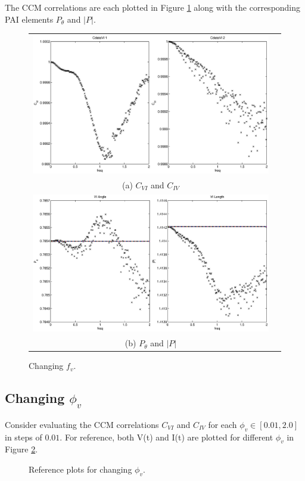 \documentclass{article}
\begin{document}
The CCM correlations are each plotted in Figure \ref{fig:fv} along with the corresponding PAI elements $P_\theta$ and $|P|$.
\begin{figure}[H]
\begin{tabular}{cc}
\includegraphics[scale=0.5]{RLcirc_varyV_freq2.eps} \\
(a) $C_{VI}$ and $C_{IV}$ \\[6pt]
\includegraphics[scale=0.5]{RLcirc_varyV_freq.eps} \\
(b) $P_\theta$ and $|P|$ \\[6pt]
\end{tabular}
\caption{Changing $f_v$.}
\label{fig:fv}
\end{figure}

\subsection{Changing $\phi_v$}
Consider evaluating the CCM correlations $C_{VI}$ and $C_{IV}$ for each $\phi_v\in[0.01,2.0]$ in steps of $0.01$.  For reference, both V(t) and I(t) are plotted for different $\phi_v$ in Figure \ref{fig:Pvref}.
\begin{figure}[H]
\caption{Reference plots for changing $\phi_v$.}
\label{fig:Pvref}
\end{figure}
\end{document}
